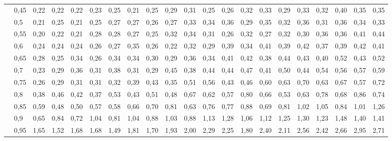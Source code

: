 \documentclass[a4paper,12pt]{article}
\theoremstyle{plain}
\begin{document}
\begin{landscape}
\begin{table}[H]
{\begin{tabular}{rl||ccccccccccccccccccc}
          & 0,45  & 0,22  & 0,22  & 0,22  & 0,23  & 0,25  & 0,21  & 0,25  & 0,29  & 0,31  & 0,25  & 0,26  & 0,32  & 0,33  & 0,29  & 0,33  & 0,32  & 0,40  & 0,35  & 0,35 \\
          & 0,5   & 0,21  & 0,25  & 0,21  & 0,25  & 0,27  & 0,27  & 0,26  & 0,27  & 0,33  & 0,34  & 0,36  & 0,29  & 0,35  & 0,32  & 0,36  & 0,31  & 0,36  & 0,34  & 0,33 \\
          & 0,55  & 0,20  & 0,22  & 0,21  & 0,28  & 0,28  & 0,27  & 0,25  & 0,32  & 0,34  & 0,31  & 0,26  & 0,32  & 0,27  & 0,32  & 0,30  & 0,36  & 0,36  & 0,41  & 0,44 \\
          & 0,6   & 0,24  & 0,24  & 0,24  & 0,26  & 0,27  & 0,35  & 0,26  & 0,22  & 0,32  & 0,29  & 0,39  & 0,34  & 0,41  & 0,39  & 0,42  & 0,37  & 0,39  & 0,42  & 0,41 \\
          & 0,65  & 0,28  & 0,25  & 0,34  & 0,26  & 0,34  & 0,34  & 0,30  & 0,29  & 0,36  & 0,34  & 0,41  & 0,42  & 0,38  & 0,44  & 0,43  & 0,40  & 0,52  & 0,43  & 0,52 \\
          & 0,7   & 0,23  & 0,29  & 0,36  & 0,31  & 0,38  & 0,31  & 0,29  & 0,45  & 0,38  & 0,44  & 0,44  & 0,47  & 0,41  & 0,50  & 0,44  & 0,54  & 0,56  & 0,57  & 0,59 \\
          & 0,75  & 0,26  & 0,29  & 0,31  & 0,31  & 0,32  & 0,39  & 0,43  & 0,35  & 0,51  & 0,56  & 0,43  & 0,46  & 0,60  & 0,63  & 0,70  & 0,63  & 0,67  & 0,57  & 0,72 \\
          & 0,8   & 0,38  & 0,46  & 0,42  & 0,37  & 0,53  & 0,43  & 0,51  & 0,48  & 0,67  & 0,62  & 0,57  & 0,80  & 0,66  & 0,53  & 0,63  & 0,78  & 0,68  & 0,86  & 0,74 \\
          & 0,85  & 0,59  & 0,48  & 0,50  & 0,57  & 0,58  & 0,66  & 0,70  & 0,81  & 0,63  & 0,76  & 0,77  & 0,88  & 0,69  & 0,81  & 1,02  & 1,05  & 0,84  & 1,01  & 1,26 \\
          & 0,9   & 0,65  & 0,84  & 0,72  & 1,04  & 0,81  & 1,04  & 0,88  & 1,03  & 0,88  & 1,13  & 1,28  & 1,06  & 1,12  & 1,25  & 1,30  & 1,23  & 1,48  & 1,40  & 1,41 \\
          & 0,95  & 1,65  & 1,52  & 1,68  & 1,68  & 1,49  & 1,81  & 1,70  & 1,93  & 2,00  & 2,29  & 2,25  & 1,80  & 2,40  & 2,11  & 2,56  & 2,42  & 2,66  & 2,95  & 2,71 \\
    \end{tabular}%
  \label{tab:addlabel}%
  }
\end{table}%
\end{landscape}
\end{document}
